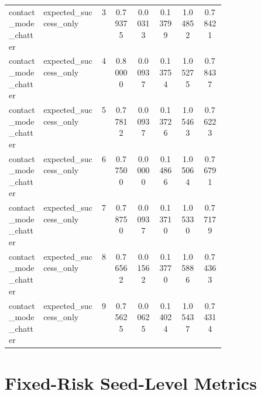 \documentclass{article}
\begin{document}
\begin{center}
\begin{longtable}{p{0.16\linewidth}p{0.27\linewidth}cccccc}
contact\_mode\_chatter & expected\_success\_only & 3 & 0.79375 & 0.00313 & 0.13799 & 1.04852 & 0.78421\\
contact\_mode\_chatter & expected\_success\_only & 4 & 0.80000 & 0.00937 & 0.13754 & 1.05275 & 0.78437\\
contact\_mode\_chatter & expected\_success\_only & 5 & 0.77812 & 0.00937 & 0.13726 & 1.05463 & 0.76223\\
contact\_mode\_chatter & expected\_success\_only & 6 & 0.77500 & 0.00000 & 0.14866 & 1.05064 & 0.76791\\
contact\_mode\_chatter & expected\_success\_only & 7 & 0.78750 & 0.00937 & 0.13710 & 1.05330 & 0.77179\\
contact\_mode\_chatter & expected\_success\_only & 8 & 0.76562 & 0.01562 & 0.13770 & 1.05886 & 0.74363\\
contact\_mode\_chatter & expected\_success\_only & 9 & 0.75625 & 0.00625 & 0.14024 & 1.05437 & 0.74314\\
\bottomrule
\end{longtable}
\normalsize
\end{center}

\section{Fixed-Risk Seed-Level Metrics}
\end{document}
